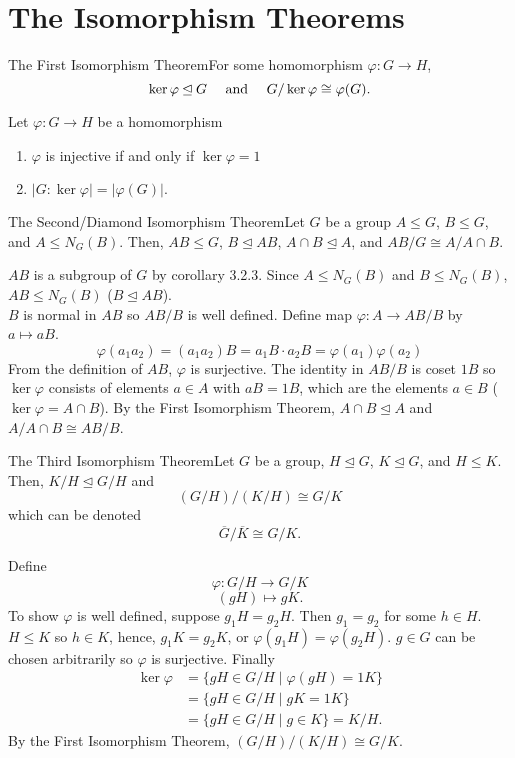 \documentclass{report}
\newcommand{\thm}[2]{\begin{Theorem}{#1}{}#2\end{Theorem}}
\newcommand{\cor}[2]{\begin{Corollary}{#1}{}#2\end{Corollary}}
\newenvironment{myproof}[1][\proofname]{%
	\proof[\bfseries #1: ]%
}{\endproof}
\begin{document}
\section{The Isomorphism Theorems}
\thm{The First Isomorphism Theorem}{For some homomorphism $\varphi : G \to H$, $$\ker \varphi \unlhd G \text{\hspace{10pt} and \hspace{10pt}} G/ \ker \varphi \cong \varphi(G).$$}
\cor{}{Let $\varphi : G \to H$ be a homomorphism
\begin{enumerate}
    \item $\varphi$ is injective if and only if $\ker \varphi = 1$
    \item $|G : \ker \varphi | = | \varphi (G)|.$
\end{enumerate}}
\thm{The Second/Diamond Isomorphism Theorem}{Let $G$ be a group $A \leq G$, $B \leq G$, and $A \leq N_G (B)$. Then, $AB 
\leq G$, $B \unlhd AB$, $A \cap B \unlhd A$, and $AB/G \cong A/A \cap B$. }
\begin{myproof}
    $AB$ is a subgroup of $G$ by corollary 3.2.3. Since $A \leq N_G (B)$ and $B \leq N_G (B)$, $AB \leq N_G (B)$ ($B \unlhd AB$). \\
    $B$ is normal in $AB$ so $AB/B$ is well defined. Define map $\varphi : A \to AB/B$ by $a \mapsto aB$. 
    $$\varphi(a_1 a_2 ) = (a_1 a_2)B = a_1 B \cdot a_2 B = \varphi(a_1) \varphi(a_2)$$
    From the definition of $AB$, $\varphi$ is surjective. The identity in $AB/B$ is coset $1B$ so $\ker \varphi$ consists of elements $a \in A$ with $aB = 1B$, which are the elements $a \in B$ ($\ker \varphi = A \cap B$). By the First Isomorphism Theorem, $A \cap B \unlhd A$ and $A/A \cap B \cong AB/B$. 
\end{myproof}
\thm{The Third Isomorphism Theorem}{Let $G$ be a group, $H \unlhd G$, $K \unlhd G$, and $H \leq K$. Then, $K/H \unlhd G/H$ and 
$$(G/H)/(K/H) \cong G/K$$
which can be denoted
$$\overline G / \overline K \cong G/K.$$}
\begin{myproof}
    Define 
    $$\varphi : G/H \to G/K$$
    $$(gH) \mapsto gK.$$
    To show $\varphi$ is well defined, suppose $g_1 H = g_2 H$. Then $g_1 = g_2$ for some $h \in H$. $H \leq K$ so $h \in K$, hence, $g_1 K = g_2 K$, or $\varphi(g_1 H) = \varphi (g_2 H)$. $g \in G$ can be chosen arbitrarily so $\varphi$ is surjective. Finally
    \begin{align*}
        \ker \varphi &= \{gH \in G/H \mid \varphi(gH) = 1K \}\\
        &= \{gH \in G/H \mid gK = 1K\} \\
        &= \{gH \in G/H \mid g \in K \} = K/H. 
    \end{align*}
    By the First Isomorphism Theorem, $(G/H)/(K/H) \cong G/K$. 
\end{myproof}
\end{document}
